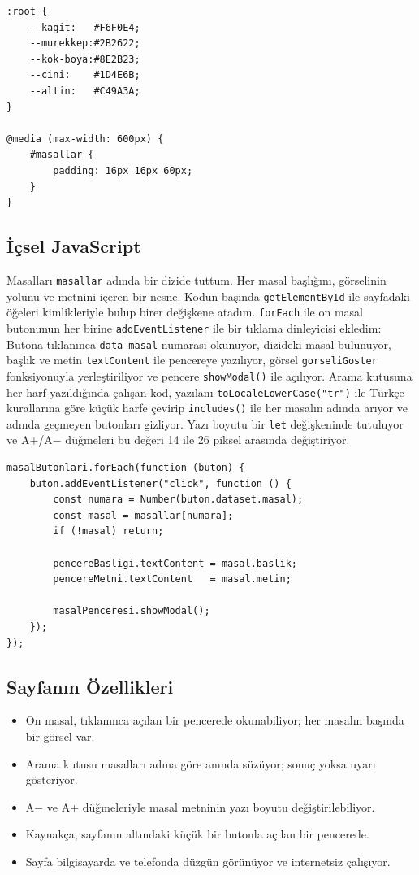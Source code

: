 \documentclass[12pt,a4paper]{article}
\begin{document}
\begin{lstlisting}[caption={İçsel CSS'ten önemli bir bölüm}]
:root {
    --kagit:   #F6F0E4;
    --murekkep:#2B2622;
    --kok-boya:#8E2B23;
    --cini:    #1D4E6B;
    --altin:   #C49A3A;
}

@media (max-width: 600px) {
    #masallar {
        padding: 16px 16px 60px;
    }
}
\end{lstlisting}

\subsection{İçsel JavaScript}
Masalları \texttt{masallar} adında bir dizide tuttum. Her masal başlığını, görselinin yolunu ve metnini içeren bir nesne. Kodun başında \texttt{getElementById} ile sayfadaki öğeleri kimlikleriyle bulup birer değişkene atadım. \texttt{forEach} ile on masal butonunun her birine \texttt{addEventListener} ile bir tıklama dinleyicisi ekledim: Butona tıklanınca \texttt{data-masal} numarası okunuyor, dizideki masal bulunuyor, başlık ve metin \texttt{textContent} ile pencereye yazılıyor, görsel \texttt{gorseliGoster} fonksiyonuyla yerleştiriliyor ve pencere \texttt{showModal()} ile açılıyor. Arama kutusuna her harf yazıldığında çalışan kod, yazılanı \texttt{toLocaleLowerCase("tr")} ile Türkçe kurallarına göre küçük harfe çevirip \texttt{includes()} ile her masalın adında arıyor ve adında geçmeyen butonları gizliyor. Yazı boyutu bir \texttt{let} değişkeninde tutuluyor ve A+/A$-$ düğmeleri bu değeri 14 ile 26 piksel arasında değiştiriyor.

\begin{lstlisting}[caption={İçsel JavaScript'ten önemli bir bölüm}]
masalButonlari.forEach(function (buton) {
    buton.addEventListener("click", function () {
        const numara = Number(buton.dataset.masal);
        const masal = masallar[numara];
        if (!masal) return;

        pencereBasligi.textContent = masal.baslik;
        pencereMetni.textContent   = masal.metin;

        masalPenceresi.showModal();
    });
});
\end{lstlisting}

\subsection{Sayfanın Özellikleri}
\begin{itemize}
  \item On masal, tıklanınca açılan bir pencerede okunabiliyor; her masalın başında bir görsel var.
  \item Arama kutusu masalları adına göre anında süzüyor; sonuç yoksa uyarı gösteriyor.
  \item A$-$ ve A+ düğmeleriyle masal metninin yazı boyutu değiştirilebiliyor.
  \item Kaynakça, sayfanın altındaki küçük bir butonla açılan bir pencerede.
  \item Sayfa bilgisayarda ve telefonda düzgün görünüyor ve internetsiz çalışıyor.
\end{itemize}
\end{document}
